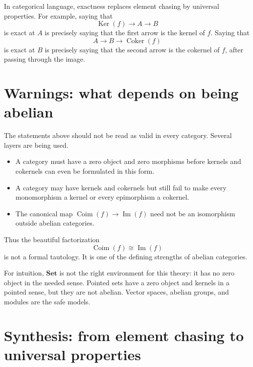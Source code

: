 In categorical language, exactness replaces element chasing by universal properties.  For example, saying that
\[
  \operatorname{Ker}(f)\to A\to B
\]
is exact at \(A\) is precisely saying that the first arrow is the kernel of \(f\).  Saying that
\[
  A\to B\to \operatorname{Coker}(f)
\]
is exact at \(B\) is precisely saying that the second arrow is the cokernel of \(f\), after passing through the image.

\section{Warnings: what depends on being abelian}

The statements above should not be read as valid in every category.  Several layers are being used.
\begin{itemize}
  \item A category must have a zero object and zero morphisms before kernels and cokernels can even be formulated in this form.
  \item A category may have kernels and cokernels but still fail to make every monomorphism a kernel or every epimorphism a cokernel.
  \item The canonical map \(\operatorname{Coim}(f)\to\operatorname{Im}(f)\) need not be an isomorphism outside abelian categories.
\end{itemize}
Thus the beautiful factorization
\[
  \operatorname{Coim}(f)\cong \operatorname{Im}(f)
\]
is not a formal tautology.  It is one of the defining strengths of abelian categories.

For intuition, \(\mathbf{Set}\) is not the right environment for this theory: it has no zero object in the needed sense.  Pointed sets have a zero object and kernels in a pointed sense, but they are not abelian.  Vector spaces, abelian groups, and modules are the safe models.

\section{Synthesis: from element chasing to universal properties}

